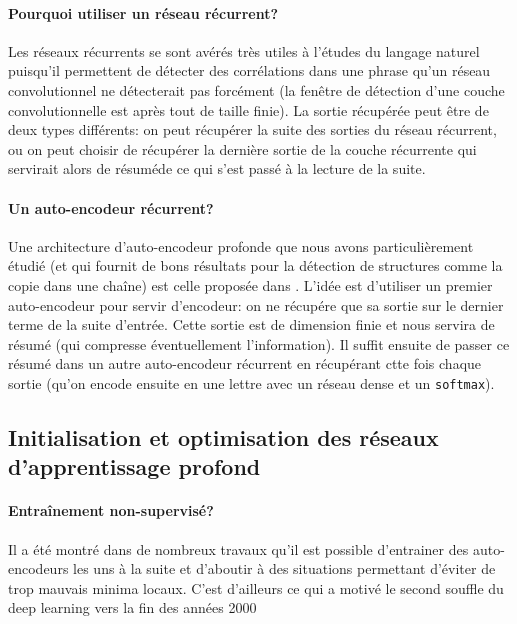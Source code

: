 \documentclass[a4paper,11pt]{article}
\begin{document}
\paragraph{Pourquoi utiliser un réseau récurrent?}

Les réseaux récurrents se sont avérés très utiles à l'études du langage naturel
puisqu'il permettent de détecter des corrélations dans une phrase qu'un réseau
convolutionnel ne détecterait pas forcément (la fenêtre de détection d'une
couche convolutionnelle est après tout de taille finie).  La sortie récupérée
peut être de deux types différents: on peut récupérer la suite des sorties du
réseau récurrent, ou on peut choisir de récupérer la dernière sortie de la
couche récurrente qui servirait alors de \og résumé\fg de ce qui s'est passé à
la lecture de la suite.

\paragraph{Un auto-encodeur récurrent?}

Une architecture d'auto-encodeur profonde que nous avons particulièrement étudié
(et qui fournit de bons résultats pour la détection de structures comme la copie
dans une chaîne) est celle proposée dans \cite{DBLP:journals/corr/ChoMGBSB14}.
L'idée est d'utiliser un premier auto-encodeur pour servir d'encodeur: on ne
récupére que sa sortie sur le dernier terme de la suite d'entrée. Cette sortie
est de dimension finie et nous servira de résumé (qui compresse éventuellement
l'information). Il suffit ensuite de passer ce résumé dans un autre
auto-encodeur récurrent en récupérant ctte fois chaque sortie (qu'on encode
ensuite en une lettre avec un réseau dense et un \texttt{softmax}).

\subsection{Initialisation et optimisation des réseaux d'apprentissage profond}

\paragraph{Entraînement non-supervisé?}

Il a été montré dans de nombreux travaux qu'il est possible d'entrainer des
auto-encodeurs les uns à la suite et d'aboutir à des situations permettant
d'éviter de trop mauvais minima locaux. C'est d'ailleurs ce qui a motivé le
second souffle du deep learning vers la fin des années 2000
\end{document}

